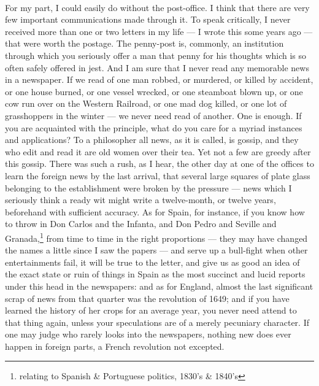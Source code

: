 \documentclass[letterpaper,12pt]{article}
\begin{document}
\paragraph{} For my part, I could easily do without the post-office. I think
that there are very few important communications made through it. To speak
critically, I never received more than one or two letters in my life --- I wrote
this some years ago --- that were worth the postage. The penny-post is,
commonly, an institution through which you seriously offer a man that penny for
his thoughts which is so often safely offered in jest. And I am sure that
I never read any memorable news in a newspaper. If we read of one man robbed, or
murdered, or killed by accident, or one house burned, or one vessel wrecked, or
one steamboat blown up, or one cow run over on the Western Railroad, or one mad
dog killed, or one lot of grasshoppers in the winter --- we never need read of
another. One is enough. If you are acquainted with the principle, what do you
care for a myriad instances and applications? To a philosopher all news, as it
is called, is gossip, and they who edit and read it are old women over their
tea. Yet not a few are greedy after this gossip. There was such a rush, as
I hear, the other day at one of the offices to learn the foreign news by the
last arrival, that several large squares of plate glass belonging to the
establishment were broken by the pressure --- news which I seriously think
a ready wit might write a twelve-month, or twelve years, beforehand with
sufficient accuracy. As for Spain, for instance, if you know how to throw in Don
Carlos and the Infanta, and Don Pedro and Seville and Granada,\footnote{relating
    to Spanish \& Portuguese politics, 1830's \& 1840's} from time to time in
the right proportions --- they may have changed the names a little since I saw
the papers --- and serve up a bull-fight when other entertainments fail, it will
be true to the letter, and give us as good an idea of the exact state or ruin of
things in Spain as the most succinct and lucid reports under this head in the
newspapers: and as for England, almost the last significant scrap of news from
that quarter was the revolution of 1649; and if you have learned the history of
her crops for an average year, you never need attend to that thing again, unless
your speculations are of a merely pecuniary character. If one may judge who
rarely looks into the newspapers, nothing new does ever happen in foreign parts,
a French revolution not excepted.
\end{document}
